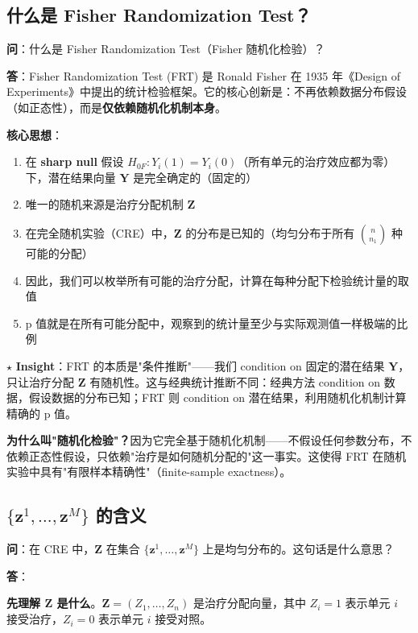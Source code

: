 \subsection{什么是 Fisher Randomization Test？}\label{sec:qa-fisher-randomization-test}

\textbf{问}：什么是 Fisher Randomization Test（Fisher 随机化检验）？

\textbf{答}：Fisher Randomization Test (FRT) 是 Ronald Fisher 在 1935 年《Design of Experiments》中提出的统计检验框架。它的核心创新是：不再依赖数据分布假设（如正态性），而是\textbf{仅依赖随机化机制本身}。

\textbf{核心思想}：

\begin{enumerate}
  \item 在 \textbf{sharp null} 假设 $H_{0F}: Y_i(1) = Y_i(0)$（所有单元的治疗效应都为零）下，潜在结果向量 $\mathbf{Y}$ 是完全确定的（固定的）
  \item 唯一的随机来源是治疗分配机制 $\mathbf{Z}$
  \item 在完全随机实验（CRE）中，$\mathbf{Z}$ 的分布是已知的（均匀分布于所有 $\binom{n}{n_1}$ 种可能的分配）
  \item 因此，我们可以枚举所有可能的治疗分配，计算在每种分配下检验统计量的取值
  \item p 值就是在所有可能分配中，观察到的统计量至少与实际观测值一样极端的比例
\end{enumerate}

$\star$ \textbf{Insight}：FRT 的本质是"条件推断"——我们 condition on 固定的潜在结果 $\mathbf{Y}$，只让治疗分配 $\mathbf{Z}$ 有随机性。这与经典统计推断不同：经典方法 condition on 数据，假设数据的分布已知；FRT 则 condition on 潜在结果，利用随机化机制计算精确的 p 值。

\textbf{为什么叫"随机化检验"？}因为它完全基于随机化机制——不假设任何参数分布，不依赖正态性假设，只依赖"治疗是如何随机分配的"这一事实。这使得 FRT 在随机实验中具有"有限样本精确性"（finite-sample exactness）。

\subsection{$\{\mathbf{z}^1, \ldots, \mathbf{z}^M\}$ 的含义}\label{sec:qa-z-set-meaning}

\textbf{问}：在 CRE 中，$\mathbf{Z}$ 在集合 $\{\mathbf{z}^1, \ldots, \mathbf{z}^M\}$ 上是均匀分布的。这句话是什么意思？

\textbf{答}：

\textbf{先理解 $\mathbf{Z}$ 是什么}。$\mathbf{Z} = (Z_1, \ldots, Z_n)$ 是治疗分配向量，其中 $Z_i = 1$ 表示单元 $i$ 接受治疗，$Z_i = 0$ 表示单元 $i$ 接受对照。

